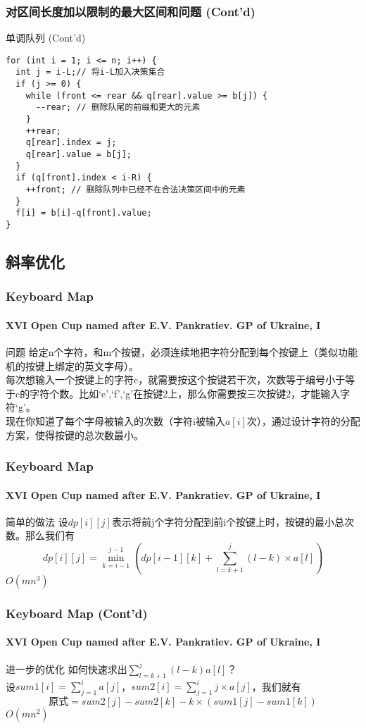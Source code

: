 \documentclass[hyperref={unicode=true}]{beamer}
\theoremstyle{definition}
\theoremstyle{proof}
\begin{document}
\begin{frame}[fragile]\frametitle{对区间长度加以限制的最大区间和问题 (Cont'd)}
  \begin{exampleblock}{单调队列 (Cont'd)}
    \scriptsize\begin{verbatim}
for (int i = 1; i <= n; i++) {
  int j = i-L;// 将i-L加入决策集合
  if (j >= 0) {
    while (front <= rear && q[rear].value >= b[j]) {
      --rear; // 删除队尾的前缀和更大的元素
    }
    ++rear;
    q[rear].index = j;
    q[rear].value = b[j];
  }
  if (q[front].index < i-R) {
    ++front; // 删除队列中已经不在合法决策区间中的元素
  }
  f[i] = b[i]-q[front].value;
}
    \end{verbatim}
  \end{exampleblock}
\end{frame}

\subsection{斜率优化}
\begin{frame}\frametitle{Keyboard Map}
  \framesubtitle{XVI Open Cup named after E.V. Pankratiev. GP of Ukraine, I}
  \begin{block}{问题}
    给定n个字符，和m个按键，必须连续地把字符分配到每个按键上（类似功能机的按键上绑定的英文字母）。\\
    每次想输入一个按键上的字符c，就需要按这个按键若干次，次数等于编号小于等于c的字符个数。比如`e',`f',`g'在按键2上，那么你需要按三次按键2，才能输入字符`g'。\\
    现在你知道了每个字母被输入的次数（字符i被输入$a[i]$次），通过设计字符的分配方案，使得按键的总次数最小。
  \end{block}
\end{frame}

\begin{frame}\frametitle{Keyboard Map}
  \framesubtitle{XVI Open Cup named after E.V. Pankratiev. GP of Ukraine, I}
  \begin{alertblock}{简单的做法}
    设$dp[i][j]$表示将前j个字符分配到前i个按键上时，按键的最小总次数。那么我们有
    \[dp[i][j] = \min_{k=i-1}^{j-1}{(dp[i-1][k] + \sum_{l=k+1}^{j}(l-k)\times a[l])}\]
    $O(mn^3)$
  \end{alertblock}
\end{frame}

\begin{frame}\frametitle{Keyboard Map (Cont'd)}
  \framesubtitle{XVI Open Cup named after E.V. Pankratiev. GP of Ukraine, I}
  \begin{alertblock}{进一步的优化}
    如何快速求出$\sum_{l=k+1}^{j}(l-k)a[l]$？\\
    \pause{}设$sum1[i] = \sum_{j=1}^i a[j]$，$sum2[i] = \sum_{j=1}^i{j}\times a[j]$，我们就有
    \[\text{原式}=sum2[j]-sum2[k]-k \times (sum1[j]-sum1[k])\]
    $O(mn^2)$
  \end{alertblock}
\end{frame}
\end{document}
